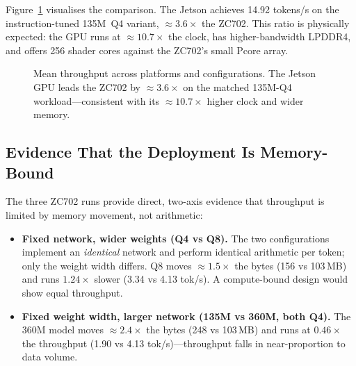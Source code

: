 Figure~\ref{fig:p4-bars} visualises the comparison. The Jetson achieves 14.92 tokens/s on the
instruction-tuned 135M~Q4 variant, $\approx 3.6\times$ the ZC702. This ratio is physically expected:
the GPU runs at $\approx 10.7\times$ the clock, has higher-bandwidth LPDDR4, and offers 256 shader
cores against the ZC702's small Pcore array.

\begin{figure}[H]
\centering
{}
\caption{Mean throughput across platforms and configurations. The Jetson GPU leads the ZC702 by
$\approx 3.6\times$ on the matched 135M-Q4 workload---consistent with its $\approx 10.7\times$ higher
clock and wider memory.}
\label{fig:p4-bars}
\end{figure}

\subsection{Evidence That the Deployment Is Memory-Bound}
\label{subsec:p4-membound}

The three ZC702 runs provide direct, two-axis evidence that throughput is limited by memory
movement, not arithmetic:

\begin{itemize}
  \item \textbf{Fixed network, wider weights (Q4 vs Q8).} The two configurations implement an
  \emph{identical} network and perform identical arithmetic per token; only the weight width differs.
  Q8 moves $\approx 1.5\times$ the bytes (156 vs 103\,MB) and runs $1.24\times$ slower (3.34 vs
  4.13 tok/s). A compute-bound design would show equal throughput.
  \item \textbf{Fixed weight width, larger network (135M vs 360M, both Q4).} The 360M model moves
  $\approx 2.4\times$ the bytes (248 vs 103\,MB) and runs at $0.46\times$ the throughput
  (1.90 vs 4.13 tok/s)---throughput falls in near-proportion to data volume.
\end{itemize}

